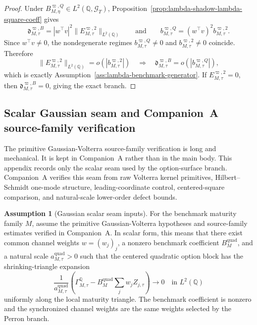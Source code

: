 \documentclass[11pt,a4paper]{amsart}
\theoremstyle{plain}
\theoremstyle{definition}
\newtheorem{assumption}[theorem]{Assumption}
\theoremstyle{remark}
\newcommand{\QQ}{\mathbb{Q}}
\newcommand{\cG}{\mathcal{G}}
\begin{document}
\begin{proof}
Under \(B_{M,\eta}^{\varpi,Q}\in L^2(\QQ,\cG_T)\),
Proposition~\ref{prop:lambda-shadow-lambda-square-coeff} gives
\[
        \mathfrak d_{M,\tau}^{\varpi,B}
        =
        |w^\top v|^2\|E_{M,\tau}^{\varpi,2}\|_{L^2(\QQ)}
        \qquad
        \text{and}
        \qquad
        b_{M,\tau}^{\varpi,Q}
        =
        (w^\top v)^2 b_{M,\tau}^{\varpi,2}.
\]
Since \(w^\top v\neq0\), the nondegenerate regimes \(b_{M,\tau}^{\varpi,Q}\neq0\) and
\(b_{M,\tau}^{\varpi,2}\neq0\) coincide.  Therefore
\[
        \|E_{M,\tau}^{\varpi,2}\|_{L^2(\QQ)}
        =
        o\!\left(|b_{M,\tau}^{\varpi,2}|\right)
        \quad\Longrightarrow\quad
        \mathfrak d_{M,\tau}^{\varpi,B}
        =
        o\!\left(|b_{M,\tau}^{\varpi,Q}|\right),
\]
which is exactly Assumption~\ref{ass:lambda-benchmark-generator}.  If
\(E_{M,\tau}^{\varpi,2}=0\), then \(\mathfrak d_{M,\tau}^{\varpi,B}=0\), giving the exact
branch.
\end{proof}


\subsection{Scalar Gaussian seam and Companion~A source-family verification}\label{subsec:scalar-gaussian-seam}

The primitive Gaussian-Volterra source-family verification is long and mechanical.  It is kept in
Companion~A rather than in the main body.  This appendix records only the scalar
seam used by the option-surface branch.  Companion~A verifies this seam from raw Volterra
kernel primitives, Hilbert--Schmidt one-mode structure, leading-coordinate control, centered-square
comparison, and natural-scale lower-order defect bounds.

\begin{assumption}[Gaussian scalar seam inputs]\label{ass:gaussian-scalar-seam-package}
For the benchmark maturity family \(M\), assume the primitive Gaussian-Volterra hypotheses and
source-family estimates verified in Companion~A.  In scalar form, this means that
there exist common channel weights \(w=(w_j)_j\), a nonzero benchmark coefficient
\(B_M^{\mathrm{quad}}\), and a natural scale \(a_{M,\tau}^{\mathrm{quad}}>0\) such that the centered
quadratic option block has the shrinking-triangle expansion
\[
        \frac{1}{a_{M,\tau}^{\mathrm{quad}}}
        \left(
        \Gamma_{M,\tau}^{\QQ}-B_M^{\mathrm{quad}}
        \sum_j w_j Z_{j,\tau}
        \right)
        \longrightarrow 0
        \quad\text{in }L^2(\QQ)
\]
uniformly along the local maturity triangle.  The benchmark coefficient is nonzero and the
synchronized channel weights are the same weights selected by the Perron branch.
\end{assumption}
\end{document}
